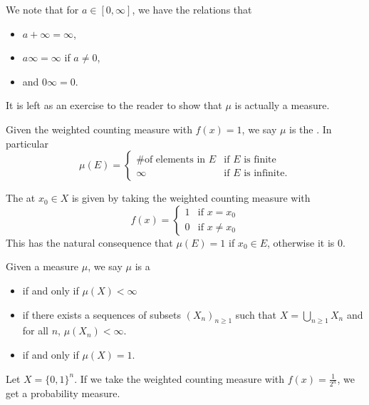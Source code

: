 \documentclass[11pt,leqno,oneside]{amsbook}
\numberwithin{thm}{section}
\newcommand{\s}{$\sigma$-} %
\begin{document}
\begin{rmk}
We note that for $a \in [0,\infty]$, we have the relations that
\begin{itemize}
\item $a + \infty = \infty$,
\item $a \infty = \infty$ if $a \neq 0$,
\item and $0 \infty = 0$.
\end{itemize}
\end{rmk}
It is left as an exercise to the reader to show that $\mu$ is actually
a measure.
\begin{defn}
  Given the weighted counting measure with $f(x) = 1$, we say $\mu$ is
  the . In particular
\[
    \mu(E) =
    \begin{cases}
      \text{\# of elements in }E&\text{if }E\text{ is finite} \\
      \infty&\text{if }E\text{ is infinite.}
    \end{cases}
  \]
\end{defn}
\begin{defn}
  The  at $x_0 \in X$ is given by taking the
  weighted counting measure with \[
    f(x) =
    \begin{cases}
      1 & \text{if } x = x_0 \\
      0 & \text{if } x \neq x_0
    \end{cases}
  \]
  This has the natural consequence that $\mu(E) = 1$ if $x_0 \in E$,
  otherwise it is 0.
\end{defn}
\begin{defn}
  Given a measure $\mu$, we say $\mu$ is a
  \begin{itemize}
  \item {} if and only if $\mu(X) < \infty$
  \item \de{\s finite measure} if there exists a sequences of
    subsets $(X_n)_{n \geq 1}$ such that $X = \bigcup_{n \geq 1} X_n$
    and for all $n$, $\mu(X_n) < \infty$.
  \item {} if and only if $\mu(X) = 1$.
  \end{itemize}
\end{defn}
\begin{example}
  Let $X = \{0,1\}^n$. If we take the weighted counting measure with
  $f(x) = \frac{1}{2^n}$, we get a probability measure.
\end{example}
\end{document}
